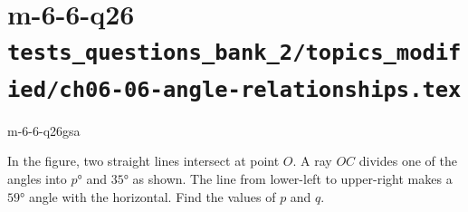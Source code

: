 \documentclass[12pt, fleqn, openany]{studyGuide}
\begin{document}
\newpage
\section*{m-6-6-q26 \hfill \normalsize\texttt{tests\_questions\_bank\_2/topics\_modified/ch06-06-angle-relationships.tex}}
\begin{practiceQuestion}{m-6-6-q26}{gsa}
\begin{questionText}
In the figure, two straight lines intersect at point $O$. A ray $OC$ divides one of the angles into $p°$ and $35°$ as shown. The line from lower-left to upper-right makes a $59°$ angle with the horizontal. Find the values of $p$ and $q$.

\begin{center}
\end{center}
\end{questionText}
\end{practiceQuestion}

\newpage
\end{document}
